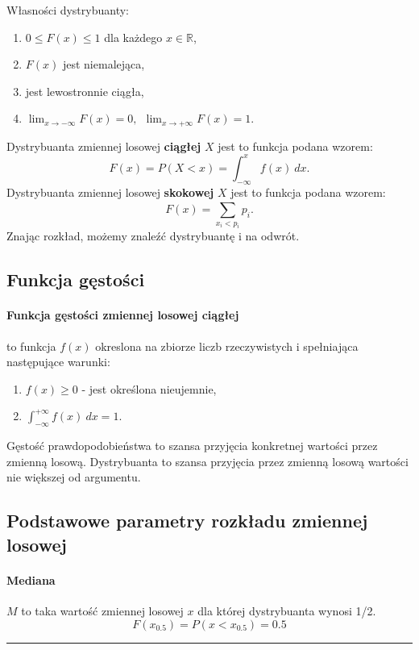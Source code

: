 \documentclass[a4paper,twoside]{report}
\begin{document}
Własności dystrybuanty:
\begin{enumerate}
\item $0 \le F(x) \le 1$ dla każdego $x \in \mathbb{R}$,
\item $F(x)$ jest niemalejąca,
\item jest lewostronnie ciągła,
\item $\lim_{x \to - \infty} F(x) = 0, ~~\lim_{x \to + \infty} F(x) = 1.$
\end{enumerate}
\medskip
Dystrybuanta zmiennej losowej \textbf{ciągłej} $X$ jest to funkcja podana wzorem:
\begin{equation}
F(x) = P(X < x) = \int_{-\infty}^{x} f(x)~dx.
\end{equation}
\medskip
Dystrybuanta zmiennej losowej \textbf{skokowej} $X$ jest to funkcja podana wzorem:
\begin{equation}
F(x)=\sum_{x_i < p_i}^{} p_i.
\end{equation}
Znając rozkład, możemy znaleźć dystrybuantę i na odwrót.
\subsection{Funkcja gęstości}

\paragraph{Funkcja gęstości zmiennej losowej ciągłej} to funkcja $f(x)$ okreslona na zbiorze liczb rzeczywistych i spełniająca następujące warunki:

\begin{enumerate}
\item $f(x) \ge 0$ - jest określona nieujemnie,
\item $ \int_{-\infty}^{+ \infty} f(x)~dx = 1$.
\end{enumerate}
Gęstość prawdopodobieństwa to szansa przyjęcia konkretnej wartości
przez zmienną losową. Dystrybuanta to szansa przyjęcia przez zmienną
losową wartości nie większej od argumentu.


\subsection{Podstawowe parametry rozkładu zmiennej losowej}
\paragraph{Mediana} $M$ to taka wartość zmiennej losowej $x$ dla której dystrybuanta wynosi 1/2.
\begin{equation}
F(x_{0.5}) = P(x < x_{0.5}) = 0.5
\end{equation}
\rule{\textwidth}{1pt}
\end{document}
